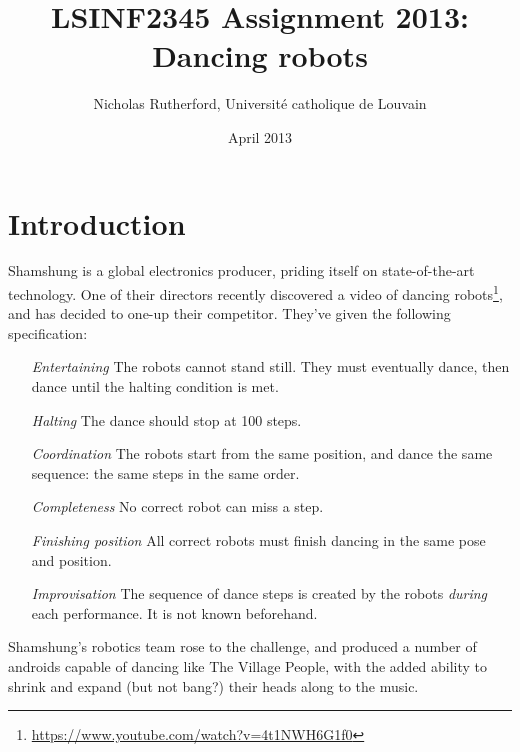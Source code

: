 \documentclass[a4paper]{article}
\title{LSINF2345 Assignment 2013: Dancing robots}
\author{Nicholas Rutherford, Université catholique de Louvain}
\date{April 2013}
\begin{document}
\ifpdf
{}
\else
{}
\fi

\maketitle


\section*{Introduction}

Shamshung is a global electronics producer, priding itself on state-of-the-art
technology. One of their directors recently discovered a video of dancing
robots\footnote{\url{https://www.youtube.com/watch?v=4t1NWH6G1f0}}, and has
decided to one-up their competitor. They've given the following specification:

\begin{itemize}

  \item[\emph{Entertaining}] The robots cannot stand still. They must eventually dance, then dance until the halting condition is met.

  \item[\emph{Halting}] The dance should stop at 100 steps.

  \item[\emph{Coordination}] The robots start from the same position, and dance the same sequence: the same steps in the same order.

  \item[\emph{Completeness}] No correct robot can miss a step.

  \item[\emph{Finishing position}] All correct robots must finish dancing in the same
  pose and position.

  \item[\emph{Improvisation}] The sequence of dance steps is created by the robots
  \emph{during} each performance. It is not known beforehand.


\end{itemize}

Shamshung's robotics team rose to the challenge, and produced a number of
androids capable of dancing like The Village People, with the added
ability to shrink and expand (but not bang?) their heads along to the music.
\end{document}
